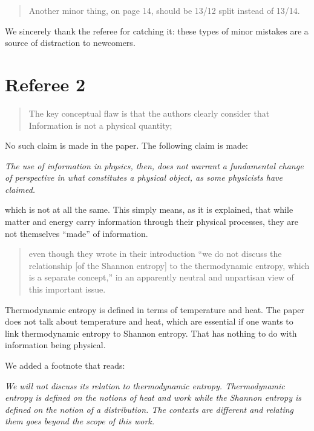 \documentclass[11pt]{article}
\begin{document}
\begin{quote}
Another minor thing, on page 14, should be 13/12 split instead of 13/14.  
\end{quote}
We sincerely thank the referee for catching it: these types of minor mistakes are a source of distraction to newcomers.

\section*{Referee 2}

\begin{quote}
	The key conceptual flaw is that the authors clearly consider that Information is not a physical quantity;
\end{quote}

No such claim is made in the paper. The following claim is made:

\emph{The use of information in physics, then, does not warrant a fundamental change of perspective in what constitutes a physical object, as some physicists have claimed.}

\noindent which is not at all the same. This simply means, as it is explained, that while matter and energy carry information through their physical processes, they are not themselves ``made'' of information.

\begin{quote}
	even though they wrote in their introduction “we do not discuss the relationship [of the Shannon entropy] to the thermodynamic entropy, which is a separate concept,” in an apparently neutral and unpartisan view of this important issue.
\end{quote}
Thermodynamic entropy is defined in terms of temperature and heat. The paper does not talk about temperature and heat, which are essential if one wants to link thermodynamic entropy to Shannon entropy. That has nothing to do with information being physical.

We added a footnote that reads:

\emph{We will not discuss its relation to thermodynamic entropy. Thermodynamic entropy is defined on the notions of heat and work while the Shannon entropy is defined on the notion of a distribution. The contexts are different and relating them goes beyond the scope of this work.}
\end{document}
